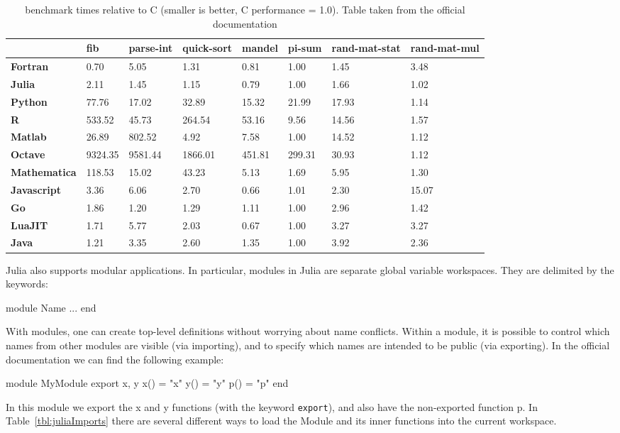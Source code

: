 \begin{table}[htb]
\centering
\caption[benchmark times relative to C]{benchmark times relative to C (smaller is better, C performance = 1.0). Table taken from the official documentation}
\label{tbl:JuliaBenchmark}
\begin{tabular}{p{2cm} | p{1.2cm} | p{1.3cm} | p{1.3cm} | p{1.3cm} | p{1.2cm} | p{1.2cm} | p{1.2cm}}
\toprule
&\textbf{fib}& \textbf{parse-int}&\textbf{quick-sort}& \textbf{mandel}&\textbf{pi-sum}& \textbf{rand-mat-stat}& \textbf{rand-mat-mul}\\ \midrule
\textbf{Fortran} 	& 0.70	& 5.05	& 1.31	& 0.81	& 1.00	& 1.45	& 3.48\\ \midrule
\textbf{Julia}		& 2.11	& 1.45	& 1.15	& 0.79	& 1.00	& 1.66	& 1.02\\ \midrule
\textbf{Python}         & 77.76	& 17.02	& 32.89	& 15.32	& 21.99	& 17.93	& 1.14\\ \midrule
\textbf{R}		&533.52	& 45.73	&264.54	& 53.16	& 9.56	& 14.56	& 1.57\\ \midrule
\textbf{Matlab}		& 26.89	&802.52	& 4.92	& 7.58	& 1.00	& 14.52	& 1.12\\ \midrule
\textbf{Octave}         &9324.35&9581.44&1866.01&451.81	&299.31	& 30.93	& 1.12\\ \midrule
\textbf{Mathematica}	&118.53	&15.02	& 43.23	& 5.13	& 1.69	& 5.95	& 1.30\\ \midrule
\textbf{Javascript}	& 3.36	& 6.06	& 2.70	& 0.66	& 1.01	& 2.30	& 15.07\\ \midrule
\textbf{Go}		& 1.86	& 1.20	& 1.29	& 1.11	& 1.00	& 2.96	& 1.42\\ \midrule
\textbf{LuaJIT}         & 1.71	& 5.77	& 2.03	& 0.67	& 1.00	& 3.27	& 3.27\\ \midrule
\textbf{Java}	        & 1.21	& 3.35	& 2.60	& 1.35	& 1.00	& 3.92	& 2.36\\ \midrule
\bottomrule
\end{tabular}
\end{table}

Julia also supports modular applications. In particular, modules in Julia are separate global variable workspaces. They are delimited by the keywords:
\begin{julia}
 module Name
 ...
 end
\end{julia}

With modules, one can create top-level definitions without worrying about name conflicts. Within a module, it is possible to control which names from other modules are visible (via importing), and to specify which names are intended to be public (via exporting). In the official documentation we can find the following example:
\begin{julia}
 module MyModule
 export x, y
 x() = "x"
 y() = "y"
 p() = "p"
end
\end{julia}
In this module we export the x and y functions (with the keyword \texttt{export}), and also have the non-exported function p. In Table~\ref{tbl:juliaImports} there are several different ways to load the Module and its inner functions into the current workspace.

